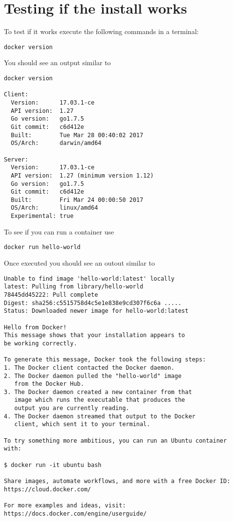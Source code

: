 \section{Testing if the install works}\label{testing-if-the-install-works}

To test if it works execute the following commands in a terminal:

\begin{verbatim}
docker version
\end{verbatim}

You should see an output similar to

\begin{verbatim}
docker version

Client:
  Version:      17.03.1-ce
  API version:  1.27
  Go version:   go1.7.5
  Git commit:   c6d412e
  Built:        Tue Mar 28 00:40:02 2017
  OS/Arch:      darwin/amd64

Server:
  Version:      17.03.1-ce
  API version:  1.27 (minimum version 1.12)
  Go version:   go1.7.5
  Git commit:   c6d412e
  Built:        Fri Mar 24 00:00:50 2017
  OS/Arch:      linux/amd64
  Experimental: true
\end{verbatim}

To see if you can run a container use

\begin{verbatim}
docker run hello-world
\end{verbatim}

Once executed you should see an outout similar to

\begin{verbatim}
Unable to find image 'hello-world:latest' locally
latest: Pulling from library/hello-world
78445dd45222: Pull complete 
Digest: sha256:c5515758d4c5e1e838e9cd307f6c6a .....
Status: Downloaded newer image for hello-world:latest

Hello from Docker!
This message shows that your installation appears to 
be working correctly.

To generate this message, Docker took the following steps:
1. The Docker client contacted the Docker daemon.
2. The Docker daemon pulled the "hello-world" image 
   from the Docker Hub.
3. The Docker daemon created a new container from that 
   image which runs the executable that produces the 
   output you are currently reading.
4. The Docker daemon streamed that output to the Docker 
   client, which sent it to your terminal.

To try something more ambitious, you can run an Ubuntu container 
with:

$ docker run -it ubuntu bash

Share images, automate workflows, and more with a free Docker ID:
https://cloud.docker.com/

For more examples and ideas, visit:
https://docs.docker.com/engine/userguide/
\end{verbatim}
